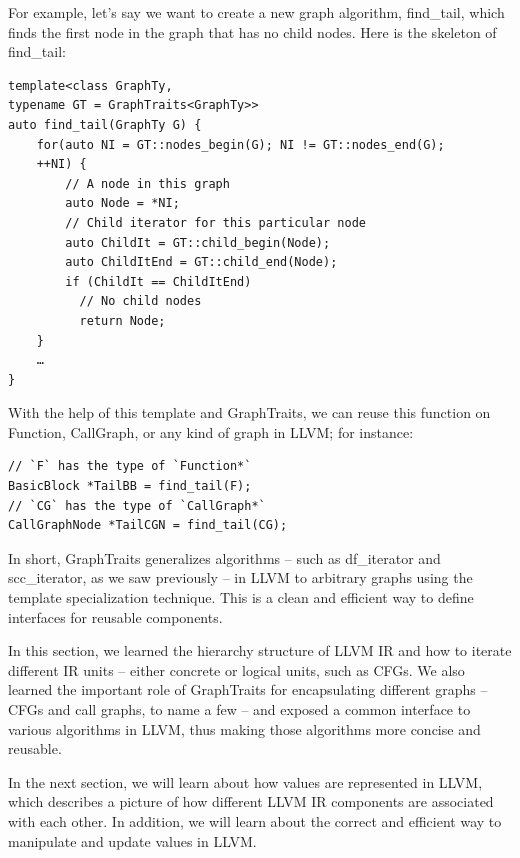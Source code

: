 For example, let's say we want to create a new graph algorithm, find\_tail, which finds the first node in the graph that has no child nodes. Here is the skeleton of find\_tail:

\begin{lstlisting}[style=styleCXX]
template<class GraphTy,
typename GT = GraphTraits<GraphTy>>
auto find_tail(GraphTy G) {
	for(auto NI = GT::nodes_begin(G); NI != GT::nodes_end(G);
	++NI) {
		// A node in this graph
		auto Node = *NI;
		// Child iterator for this particular node
		auto ChildIt = GT::child_begin(Node);
		auto ChildItEnd = GT::child_end(Node);
		if (ChildIt == ChildItEnd)
		  // No child nodes
		  return Node;
	}
	…
}
\end{lstlisting}

With the help of this template and GraphTraits, we can reuse this function on Function, CallGraph, or any kind of graph in LLVM; for instance:

\begin{lstlisting}[style=styleCXX]
// `F` has the type of `Function*`
BasicBlock *TailBB = find_tail(F);
// `CG` has the type of `CallGraph*`
CallGraphNode *TailCGN = find_tail(CG);
\end{lstlisting}

In short, GraphTraits generalizes algorithms – such as df\_iterator and scc\_iterator, as we saw previously – in LLVM to arbitrary graphs using the template specialization technique. This is a clean and efficient way to define interfaces for reusable components.

In this section, we learned the hierarchy structure of LLVM IR and how to iterate different IR units – either concrete or logical units, such as CFGs. We also learned the important role of GraphTraits for encapsulating different graphs – CFGs and call graphs, to name a few – and exposed a common interface to various algorithms in LLVM, thus making those algorithms more concise and reusable.

In the next section, we will learn about how values are represented in LLVM, which describes a picture of how different LLVM IR components are associated with each other. In addition, we will learn about the correct and efficient way to manipulate and update values in LLVM.











